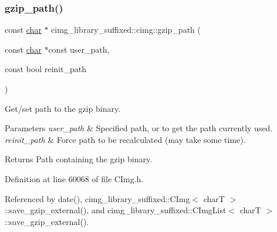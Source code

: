 \subsubsection{\texorpdfstring{gzip\+\_\+path()}{gzip\_path()}}
{\footnotesize\ttfamily const \hyperlink{classchar}{char} $\ast$ cimg\+\_\+library\+\_\+suffixed\+::cimg\+::gzip\+\_\+path (\begin{DoxyParamCaption}\item[{const \hyperlink{classchar}{char} $\ast$const}]{user\+\_\+path,  }\item[{const bool}]{reinit\+\_\+path }\end{DoxyParamCaption})\hspace{0.3cm}{\ttfamily [inline]}}



Get/set path to the {\ttfamily gzip} binary. 


\begin{DoxyParams}{Parameters}
{\em user\+\_\+path} & Specified path, or {} to get the path currently used. \\
\hline
{\em reinit\+\_\+path} & Force path to be recalculated (may take some time). \\
\hline
\end{DoxyParams}
\begin{DoxyReturn}{Returns}
Path containing the {\ttfamily gzip} binary. 
\end{DoxyReturn}


Definition at line 60068 of file C\+Img.\+h.



Referenced by date(), cimg\+\_\+library\+\_\+suffixed\+::\+C\+Img$<$ char\+T $>$\+::save\+\_\+gzip\+\_\+external(), and cimg\+\_\+library\+\_\+suffixed\+::\+C\+Img\+List$<$ char\+T $>$\+::save\+\_\+gzip\+\_\+external().

